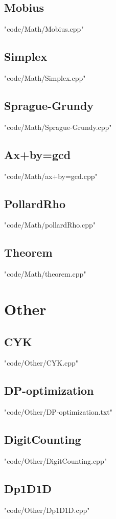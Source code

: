 \subsection{Mobius}
 {"code/Math/Mobius.cpp"}
\subsection{Simplex}
 {"code/Math/Simplex.cpp"}
\subsection{Sprague-Grundy}
 {"code/Math/Sprague-Grundy.cpp"}
\subsection{Ax+by=gcd}
 {"code/Math/ax+by=gcd.cpp"}
\subsection{PollardRho}
 {"code/Math/pollardRho.cpp"}
\subsection{Theorem}
 {"code/Math/theorem.cpp"}
\section{Other}
\subsection{CYK}
 {"code/Other/CYK.cpp"}
\subsection{DP-optimization}
 {"code/Other/DP-optimization.txt"}
\subsection{DigitCounting}
 {"code/Other/DigitCounting.cpp"}
\subsection{Dp1D1D}
 {"code/Other/Dp1D1D.cpp"}
